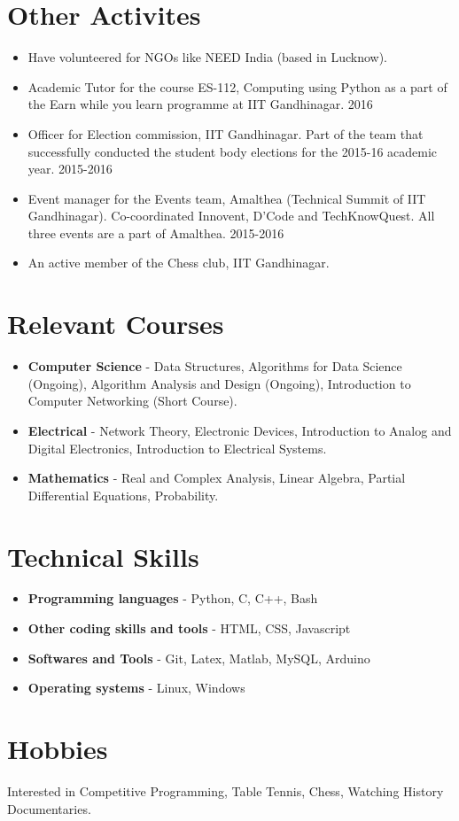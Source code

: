 \documentclass[margin, centered]{res}
\begin{document}
\begin{resume}
\section{Other Activites}
\begin{itemize}[leftmargin=*]
\item Have volunteered for NGOs like NEED India (based in Lucknow).
\item Academic Tutor for the course ES-112, Computing using Python as a part of the Earn while you learn programme at IIT Gandhinagar.
\hfill {2016}
\item Officer for Election commission, IIT Gandhinagar. Part of the team that successfully conducted the student body elections for the 2015-16 academic year.
\hfill{2015-2016}
\item Event manager for the Events team, Amalthea (Technical Summit of IIT Gandhinagar). Co-coordinated Innovent, D’Code and TechKnowQuest. All three events are a part of Amalthea.
\hfill{2015-2016}
\item An active member of the Chess club, IIT Gandhinagar.
\end{itemize}
\section{Relevant Courses}
\begin{itemize}[leftmargin=*]
\item {\bf Computer Science} - Data Structures, Algorithms for Data Science (Ongoing), Algorithm Analysis and Design (Ongoing), Introduction to Computer Networking (Short Course).
\item {\bf Electrical} - Network Theory, Electronic Devices, Introduction to Analog and Digital Electronics, Introduction to Electrical Systems.
\item {\bf Mathematics} - Real and Complex Analysis, Linear Algebra, Partial Differential Equations, Probability.

\end{itemize}

\section{Technical Skills}
\begin{itemize}[leftmargin=*]
\item {\bf Programming languages} - Python, C, C++, Bash
\item {\bf Other coding skills and tools} - HTML, CSS, Javascript
\item {\bf Softwares and Tools} - Git, Latex, Matlab, MySQL, Arduino
\item {\bf Operating systems} - Linux, Windows
\end{itemize}



\section{Hobbies}Interested in Competitive Programming, Table Tennis, Chess, Watching History Documentaries.

\end{resume}
\end{document}
